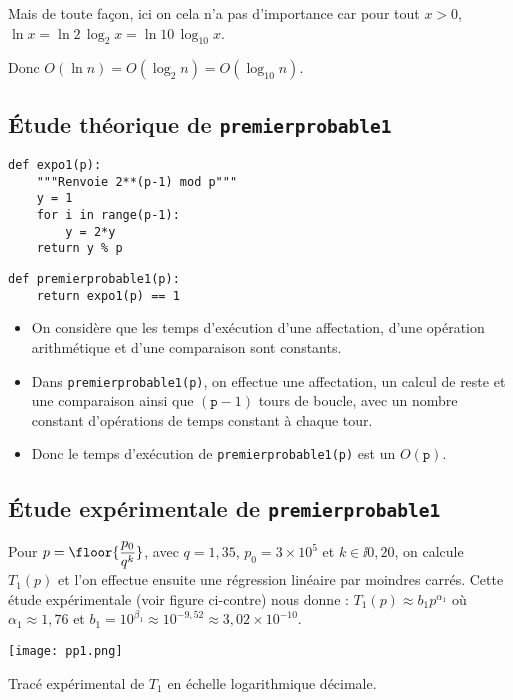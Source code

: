 Mais de toute façon, ici on cela n'a pas d'importance car pour tout $x>0$, $ \ln x = \ln 2 \, \log_{2} x = \ln 10\, \log_{10}x$.

Donc $ O(\ln n) = O(\log_{2} n) = O(\log_{10} n)$.

\subsection{Étude théorique de \lstinline{premierprobable1}}


\begin{lstlisting}
def expo1(p):
    """Renvoie 2**(p-1) mod p"""
    y = 1
    for i in range(p-1):
        y = 2*y
    return y % p
\end{lstlisting}

\begin{lstlisting}
def premierprobable1(p):
    return expo1(p) == 1
\end{lstlisting}

\begin{itemize}
\item On considère que les temps d'exécution d'une affectation, d'une
  opération arithmétique et d'une comparaison sont constants.
\item Dans \lstinline{premierprobable1(p)}, on effectue une affectation, un
  calcul de reste et
  une comparaison ainsi que $(\texttt{p}-1)$ tours de boucle, avec un
  nombre constant d'opérations de temps constant à chaque tour.
\item Donc le temps d'exécution de \lstinline{premierprobable1(p)} est un
  $O(\texttt{p})$.
\end{itemize}

\subsection{Étude expérimentale de \lstinline{premierprobable1}}



Pour $p = \floor{\dfrac{p_0}{q^k}}$, avec $q = 1,35$, $p_0 = 3\times 10^5$ et $k\in\ii{0,20}$, on calcule $T_1(p)$ et l'on effectue ensuite une régression linéaire par moindres carrés. Cette étude expérimentale 
(voir figure ci-contre)
nous donne :
$  T_{1}(p)\approx b_{1} p^{\alpha_{1}}$ où $\alpha_{1}\approx 1,76$
et  $b_{1} = 10^{\beta_{1}} \approx 10^{-9,52}  \approx 3,02 \times 10^{-10}$.


  \begin{marginfigure}
    \texttt{[image: pp1.png]}
    \caption{Tracé expérimental de $T_1$ en échelle logarithmique décimale.}
  \end{marginfigure}

